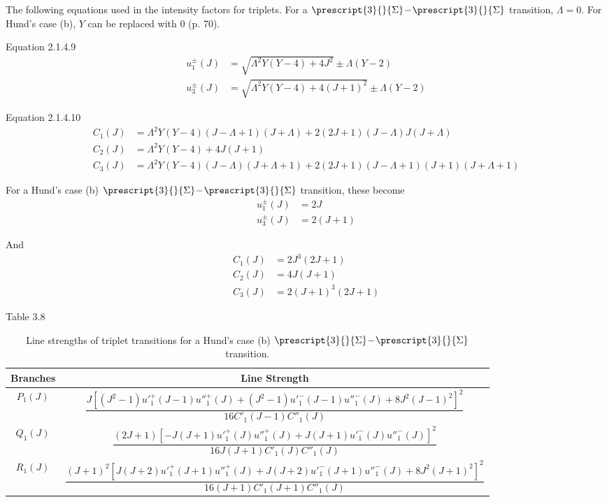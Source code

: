 \documentclass[11pt, twoside, fleqn]{report}
\newcommand{\dash}{\!-\!}
\newcommand{\state}[2]{\prescript{#1}{}{#2}}
\begin{document}
The following equations used in the intensity factors for triplets. For a $\state{3}{\Sigma}\dash\state{3}{\Sigma}$ transition, $\Lambda = 0$. For Hund's case (b), $Y$ can be replaced with $0$ (p. 70).

Equation 2.1.4.9
\begin{align*}
    u_1^\pm(J) & = \sqrt{\Lambda^2Y(Y - 4) + 4J^2} \pm \Lambda(Y - 2)       \\
    u_3^\pm(J) & = \sqrt{\Lambda^2Y(Y - 4) + 4(J + 1)^2} \pm \Lambda(Y - 2)
\end{align*}

Equation 2.1.4.10
\begin{align*}
    C_1(J) & = \Lambda^2Y(Y - 4)(J - \Lambda + 1)(J + \Lambda) + 2(2J + 1)(J - \Lambda)J(J + \Lambda)               \\
    C_2(J) & = \Lambda^2Y(Y - 4) + 4J(J + 1)                                                                        \\
    C_3(J) & = \Lambda^2Y(Y - 4)(J - \Lambda)(J + \Lambda + 1) + 2(2J + 1)(J - \Lambda + 1)(J + 1)(J + \Lambda + 1)
\end{align*}

For a Hund's case (b) $\state{3}{\Sigma}\dash\state{3}{\Sigma}$ transition, these become
\begin{align*}
    u_1^\pm(J) & = 2J       \\
    u_3^\pm(J) & = 2(J + 1)
\end{align*}

And
\begin{align*}
    C_1(J) & = 2J^3(2J + 1)       \\
    C_2(J) & = 4J(J + 1)          \\
    C_3(J) & = 2(J + 1)^3(2J + 1)
\end{align*}

Table 3.8
\begin{table}[H]
    \centering
    \caption{Line strengths of triplet transitions for a Hund's case (b) $\state{3}{\Sigma}\dash\state{3}{\Sigma}$ transition.}
    \begin{tabular}{cc}
        \toprule
        Branches & Line Strength                                                                                                                          \\
        \midrule
        $P_1(J)$ & $\dfrac{J[(J^2 - 1)u'^+_1(J - 1)u''^+_1(J) + (J^2 - 1)u'^-_1(J - 1)u''^-_1(J) + 8J^2(J - 1)^2]^2}{16C'_1(J - 1)C''_1(J)}$              \\
        \addlinespace[0.5em]
        $Q_1(J)$ & $\dfrac{(2J + 1)[-J(J + 1)u'^+_1(J)u''^+_1(J) + J(J + 1)u'^-_1(J)u''^-_1(J)]^2}{16J(J + 1)C'_1(J)C''_1(J)}$                            \\
        \addlinespace[0.5em]
        $R_1(J)$ & $\dfrac{(J + 1)^2[J(J + 2)u'^+_1(J + 1)u''^+_1(J) + J(J + 2)u'^-_1(J + 1)u''^-_1(J) + 8J^2(J + 1)^2]^2}{16(J + 1)C'_1(J + 1)C''_1(J)}$ \\
        \bottomrule
    \end{tabular}
\end{table}
\end{document}
